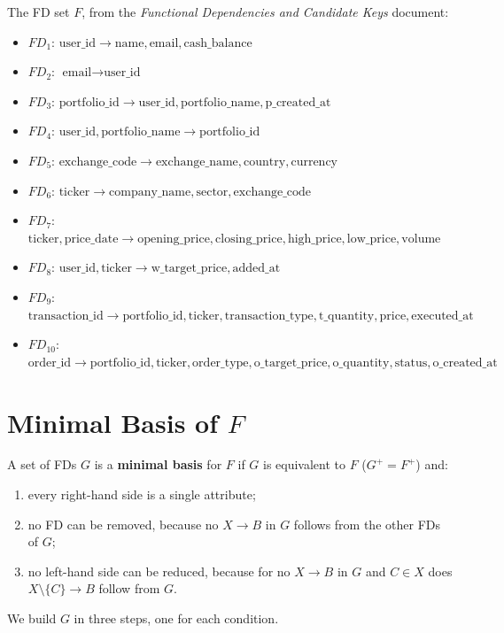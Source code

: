 \documentclass{article}
\newcommand{\at}[1]{\text{#1}}
\begin{document}
The FD set $F$, from the \emph{Functional Dependencies and Candidate Keys} document:
\begin{itemize}[leftmargin=*, nosep]
  \item $FD_1$: $\at{user\_id} \rightarrow \at{name}, \at{email}, \at{cash\_balance}$
  \item $FD_2$: $\at{email} \rightarrow \at{user\_id}$
  \item $FD_3$: $\at{portfolio\_id} \rightarrow \at{user\_id}, \at{portfolio\_name}, \at{p\_created\_at}$
  \item $FD_4$: $\at{user\_id}, \at{portfolio\_name} \rightarrow \at{portfolio\_id}$
  \item $FD_5$: $\at{exchange\_code} \rightarrow \at{exchange\_name}, \at{country}, \at{currency}$
  \item $FD_6$: $\at{ticker} \rightarrow \at{company\_name}, \at{sector}, \at{exchange\_code}$
  \item $FD_7$: $\at{ticker}, \at{price\_date} \rightarrow \at{opening\_price}, \at{closing\_price}, \at{high\_price}, \at{low\_price}, \at{volume}$
  \item $FD_8$: $\at{user\_id}, \at{ticker} \rightarrow \at{w\_target\_price}, \at{added\_at}$
  \item $FD_9$: $\at{transaction\_id} \rightarrow \at{portfolio\_id}, \at{ticker}, \at{transaction\_type}, \at{t\_quantity}, \at{price}, \at{executed\_at}$
  \item $FD_{10}$: $\at{order\_id} \rightarrow \at{portfolio\_id}, \at{ticker}, \at{order\_type}, \at{o\_target\_price}, \at{o\_quantity}, \at{status}, \at{o\_created\_at}$
\end{itemize}

\section{Minimal Basis of $F$}

A set of FDs $G$ is a \textbf{minimal basis} for $F$ if $G$ is equivalent to $F$ ($G^+ = F^+$) and:
\begin{enumerate}[label=(\arabic*), leftmargin=*]
  \item every right-hand side is a single attribute;
  \item no FD can be removed, because no $X \rightarrow B$ in $G$ follows from the other FDs of $G$;
  \item no left-hand side can be reduced, because for no $X \rightarrow B$ in $G$ and $C \in X$ does $X \setminus \{C\} \rightarrow B$ follow from $G$.
\end{enumerate}
We build $G$ in three steps, one for each condition.
\end{document}
